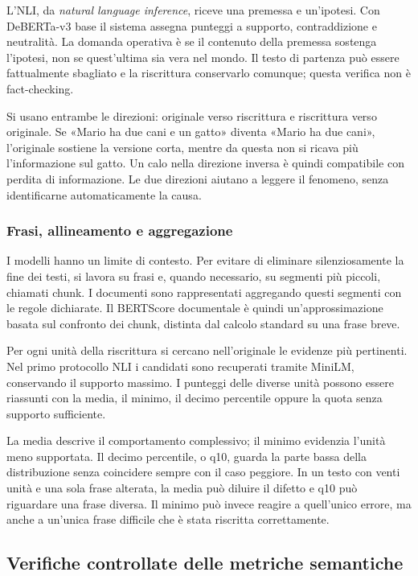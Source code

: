 \documentclass[11pt,a4paper]{article}
\begin{document}
L'NLI, da \emph{natural language inference}, riceve una premessa e un'ipotesi. Con DeBERTa-v3 base il sistema assegna punteggi a supporto, contraddizione e neutralità. La domanda operativa è se il contenuto della premessa sostenga l'ipotesi, non se quest'ultima sia vera nel mondo. Il testo di partenza può essere fattualmente sbagliato e la riscrittura conservarlo comunque; questa verifica non è fact-checking.

Si usano entrambe le direzioni: originale verso riscrittura e riscrittura verso originale. Se «Mario ha due cani e un gatto» diventa «Mario ha due cani», l'originale sostiene la versione corta, mentre da questa non si ricava più l'informazione sul gatto. Un calo nella direzione inversa è quindi compatibile con perdita di informazione. Le due direzioni aiutano a leggere il fenomeno, senza identificarne automaticamente la causa.

\subsubsection{Frasi, allineamento e aggregazione}\label{frasi-allineamento-e-aggregazione}

I modelli hanno un limite di contesto. Per evitare di eliminare silenziosamente la fine dei testi, si lavora su frasi e, quando necessario, su segmenti più piccoli, chiamati chunk. I documenti sono rappresentati aggregando questi segmenti con le regole dichiarate. Il BERTScore documentale è quindi un'approssimazione basata sul confronto dei chunk, distinta dal calcolo standard su una frase breve.

Per ogni unità della riscrittura si cercano nell'originale le evidenze più pertinenti. Nel primo protocollo NLI i candidati sono recuperati tramite MiniLM, conservando il supporto massimo. I punteggi delle diverse unità possono essere riassunti con la media, il minimo, il decimo percentile oppure la quota senza supporto sufficiente.

La media descrive il comportamento complessivo; il minimo evidenzia l'unità meno supportata. Il decimo percentile, o q10, guarda la parte bassa della distribuzione senza coincidere sempre con il caso peggiore. In un testo con venti unità e una sola frase alterata, la media può diluire il difetto e q10 può riguardare una frase diversa. Il minimo può invece reagire a quell'unico errore, ma anche a un'unica frase difficile che è stata riscritta correttamente.

\subsection{Verifiche controllate delle metriche semantiche}\label{verifiche-controllate-delle-metriche-semantiche}
\end{document}

